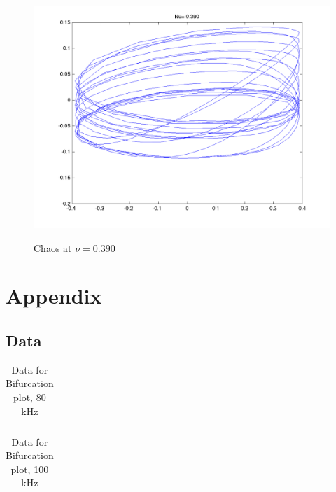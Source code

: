 \documentclass[12pt]{report}
\begin{document}
	\begin{figure}
		\centering
		\includegraphics{simulations/plotnu0390.png}
		\label{fig:sim.0390}
		\caption{Chaos at $\nu=0.390$}
	\end{figure}





\chapter*{Appendix}

\section{Data}
\label{sec:Data}

	\begin{table}
		\centering
		\begin{tabular}{|l|l|l||l|l|l|}
			\hline
			 
		\end{tabular}
		\label{tab:80khz}
		\caption{Data for Bifurcation plot, 80 kHz}
	\end{table}

	\begin{table}
		\centering
		\begin{tabular}{|l|l|l|l||l|l|l|l|}
			\hline
			 
		\end{tabular}
		\label{tab:100khz}
		\caption{Data for Bifurcation plot, 100 kHz}
	\end{table}
\end{document}
